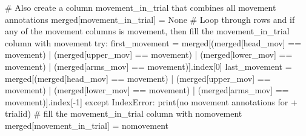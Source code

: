 \documentclass[
  letterpaper,
  DIV=11,
  numbers=noendperiod]{scrreprt}
\newenvironment{Shaded}{\begin{snugshade}}{\end{snugshade}}
\newcommand{\BuiltInTok}[1]{\textcolor[rgb]{0.00,0.23,0.31}{#1}}
\newcommand{\CommentTok}[1]{\textcolor[rgb]{0.37,0.37,0.37}{#1}}
\newcommand{\ControlFlowTok}[1]{\textcolor[rgb]{0.00,0.23,0.31}{#1}}
\newcommand{\DecValTok}[1]{\textcolor[rgb]{0.68,0.00,0.00}{#1}}
\newcommand{\NormalTok}[1]{\textcolor[rgb]{0.00,0.23,0.31}{#1}}
\newcommand{\OperatorTok}[1]{\textcolor[rgb]{0.37,0.37,0.37}{#1}}
\newcommand{\PreprocessorTok}[1]{\textcolor[rgb]{0.68,0.00,0.00}{#1}}
\newcommand{\StringTok}[1]{\textcolor[rgb]{0.13,0.47,0.30}{#1}}
\newcommand{\VariableTok}[1]{\textcolor[rgb]{0.07,0.07,0.07}{#1}}
\begin{document}
\begin{Shaded}
\begin{Highlighting}[]
    \CommentTok{\# Also create a column \textquotesingle{}movement\_in\_trial\textquotesingle{} that combines all movement annotations}
\NormalTok{    merged[}\StringTok{\textquotesingle{}movement\_in\_trial\textquotesingle{}}\NormalTok{] }\OperatorTok{=} \VariableTok{None}
    \CommentTok{\# Loop through rows and if any of the movement columns is \textquotesingle{}movement\textquotesingle{}, then fill the movement\_in\_trial column with \textquotesingle{}movement\textquotesingle{}}
    \ControlFlowTok{try}\NormalTok{:}
\NormalTok{        first\_movement }\OperatorTok{=}\NormalTok{ merged[(merged[}\StringTok{\textquotesingle{}head\_mov\textquotesingle{}}\NormalTok{] }\OperatorTok{==} \StringTok{\textquotesingle{}movement\textquotesingle{}}\NormalTok{) }\OperatorTok{|}\NormalTok{ (merged[}\StringTok{\textquotesingle{}upper\_mov\textquotesingle{}}\NormalTok{] }\OperatorTok{==} \StringTok{\textquotesingle{}movement\textquotesingle{}}\NormalTok{) }\OperatorTok{|}\NormalTok{ (merged[}\StringTok{\textquotesingle{}lower\_mov\textquotesingle{}}\NormalTok{] }\OperatorTok{==} \StringTok{\textquotesingle{}movement\textquotesingle{}}\NormalTok{) }\OperatorTok{|}\NormalTok{ (merged[}\StringTok{\textquotesingle{}arms\_mov\textquotesingle{}}\NormalTok{] }\OperatorTok{==} \StringTok{\textquotesingle{}movement\textquotesingle{}}\NormalTok{)].index[}\DecValTok{0}\NormalTok{]}
\NormalTok{        last\_movement }\OperatorTok{=}\NormalTok{ merged[(merged[}\StringTok{\textquotesingle{}head\_mov\textquotesingle{}}\NormalTok{] }\OperatorTok{==} \StringTok{\textquotesingle{}movement\textquotesingle{}}\NormalTok{) }\OperatorTok{|}\NormalTok{ (merged[}\StringTok{\textquotesingle{}upper\_mov\textquotesingle{}}\NormalTok{] }\OperatorTok{==} \StringTok{\textquotesingle{}movement\textquotesingle{}}\NormalTok{) }\OperatorTok{|}\NormalTok{ (merged[}\StringTok{\textquotesingle{}lower\_mov\textquotesingle{}}\NormalTok{] }\OperatorTok{==} \StringTok{\textquotesingle{}movement\textquotesingle{}}\NormalTok{) }\OperatorTok{|}\NormalTok{ (merged[}\StringTok{\textquotesingle{}arms\_mov\textquotesingle{}}\NormalTok{] }\OperatorTok{==} \StringTok{\textquotesingle{}movement\textquotesingle{}}\NormalTok{)].index[}\OperatorTok{{-}}\DecValTok{1}\NormalTok{]}
    \ControlFlowTok{except} \PreprocessorTok{IndexError}\NormalTok{:}
        \BuiltInTok{print}\NormalTok{(}\StringTok{\textquotesingle{}no movement annotations for \textquotesingle{}} \OperatorTok{+}\NormalTok{ trialid)}
        \CommentTok{\# fill the movement\_in\_trial column with \textquotesingle{}nomovement\textquotesingle{}}
\NormalTok{        merged[}\StringTok{\textquotesingle{}movement\_in\_trial\textquotesingle{}}\NormalTok{] }\OperatorTok{=} \StringTok{\textquotesingle{}nomovement\textquotesingle{}}
        

\end{Highlighting}
\end{Shaded}
\end{document}
